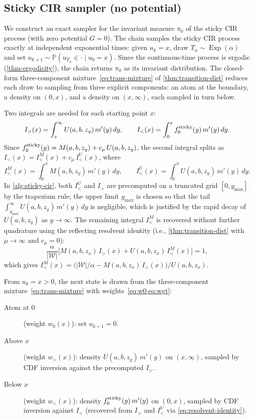 \documentclass[aap,preprint]{imsart}
\numberwithin{equation}{section}
\theoremstyle{plain}
\theoremstyle{definition}
\begin{document}
\subsection{Sticky CIR sampler (no potential)}\label{sampler-gzero}

We construct an exact sampler for the invariant measure $\pi_0$ of the sticky CIR process (with zero potential $G=0$).  The chain samples the sticky CIR process exactly at independent exponential times: given $u_k = x$, draw $T_\alpha\sim\operatorname{Exp}(\alpha)$ and set $u_{k+1}\sim\mathbb{P}(u_{T_\alpha}\in\cdot\mid u_0=x)$.  Since the continuous-time process is ergodic (\cref{thm-ergodicity}), the chain returns $\pi_0$ as its invariant distribution.  The closed-form three-component mixture~\cref{eq:trans-mixture} of \cref{thm:transition-dist} reduces each draw to sampling from three explicit components: an atom at the boundary, a density on $(0,x)$, and a density on $(x,\infty)$, each sampled in turn below.

Two integrals are needed for each starting point $x$:
\[
  I_>(x) = \int_x^\infty U(a,b,z_y)\,m'(y)\,dy, \qquad
  I_<(x) = \int_0^x f_0^{\rm sticky}(y)\,m'(y)\,dy.
\]
Since $f_0^{\rm sticky}(y) = M(a,b,z_y) + c_\mu\,U(a,b,z_y)$, the second
integral splits as $I_<(x) = I_<^M(x) + c_\mu\,I_<^U(x)$, where
\[
  I_<^M(x) = \int_0^x M(a,b,z_y)\,m'(y)\,dy, \qquad
  I_<^U(x) = \int_0^x U(a,b,z_y)\,m'(y)\,dy.
\]
In \cref{alg:sticky-cir}, both $I_<^U$ and $I_>$ are precomputed on a truncated grid $[0,y_{\max}]$ by the trapezium rule; the upper limit $y_{\max}$ is chosen so that the tail $\int_{y_{\max}}^\infty U(a,b,z_y)\,m'(y)\,dy$ is negligible, which is justified by the rapid decay of $U(a,b,z_y)$ as $y\to\infty$.
The remaining integral $I_<^M$ is recovered without further quadrature using
the reflecting resolvent identity (i.e., \cref{thm:transition-dist} with $\mu\to \infty$ and $c_\mu=0$):
\begin{equation}\label{eq:resolvent-identity}
  \frac{\alpha}{|\mathcal{W}|}\bigl[M(a,b,z_x)\,I_>(x) +
  U(a,b,z_x)\,I_<^M(x)\bigr] = 1,
\end{equation}
which gives $I_<^M(x) = \bigl(|\mathcal{W}|/\alpha -
M(a,b,z_x)\,I_>(x)\bigr)/U(a,b,z_x)$.  

From $u_k = x > 0$, the next state is drawn from the three-component mixture~\cref{eq:trans-mixture} with weights~\cref{eq:w0,eq:wgt}:
\begin{description}
  \item[Atom at $0$] (weight $w_0(x)$): set $u_{k+1}=0$.

  \item[Above $x$] (weight $w_>(x)$): density $U(a,b,z_y)\,m'(y)$ on $(x,\infty)$, sampled by CDF inversion against the precomputed $I_>$.

  \item[Below $x$] (weight $w_<(x)$): density $f_0^{\rm sticky}(y)\,m'(y)$ on $(0,x)$, sampled by CDF inversion against $I_<$ (recovered from $I_>$ and $I_<^U$ via \cref{eq:resolvent-identity}).
\end{description}
\end{document}
